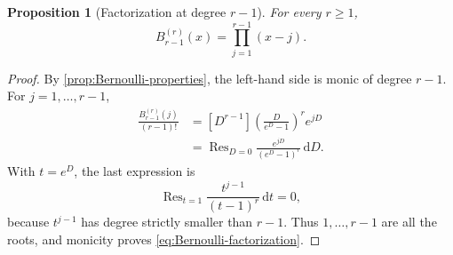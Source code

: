 \documentclass[11pt,a4paper]{amsart}
\numberwithin{equation}{section}
\newtheorem{proposition}[theorem]{Proposition}
\theoremstyle{definition}
\theoremstyle{remark}
\DeclareMathOperator*{\Res}{Res}
\newcommand{\e}{e}
\newcommand{\dd}{\mathrm d}
\begin{document}
\begin{proposition}[Factorization at degree $r-1$]
\label{prop:bernoulli-factorization}
For every $r\geq1$,
\begin{equation}
 B_{r-1}^{(r)}(x)=\prod_{j=1}^{r-1}(x-j).
 \label{eq:Bernoulli-factorization}
\end{equation}
\end{proposition}

\begin{proof}
By \cref{prop:Bernoulli-properties}, the left-hand side is monic of
degree $r-1$.  For $j=1,\ldots,r-1$,
\begin{align*}
 \frac{B_{r-1}^{(r)}(j)}{(r-1)!}
 &=[D^{r-1}]
 \left(\frac{D}{\e^D-1}\right)^r\e^{jD}\\
 &=\Res_{D=0}\frac{\e^{jD}}{(\e^D-1)^r}\,\dd D.
\end{align*}
With $t=\e^D$, the last expression is
\begin{equation*}
 \Res_{t=1}\frac{t^{j-1}}{(t-1)^r}\,\dd t=0,
\end{equation*}
because $t^{j-1}$ has degree strictly smaller than $r-1$.  Thus
$1,\ldots,r-1$ are all the roots, and monicity proves
\eqref{eq:Bernoulli-factorization}.
\end{proof}
\end{document}
